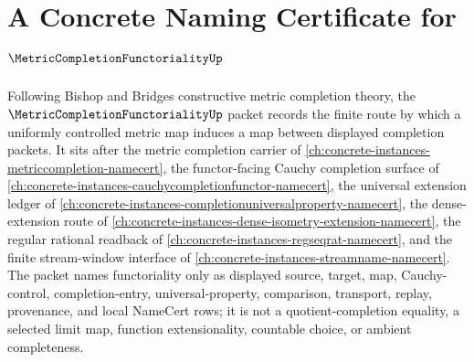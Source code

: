 \chapter{A Concrete Naming Certificate for $\MetricCompletionFunctorialityUp$}
\label{ch:concrete-instances-metric-completion-functoriality-namecert}

Following Bishop and Bridges constructive metric completion theory, the $\MetricCompletionFunctorialityUp$ packet records the finite route by which a uniformly controlled metric map induces a map between displayed completion packets. It sits after the metric completion carrier of \autoref{ch:concrete-instances-metriccompletion-namecert}, the functor-facing Cauchy completion surface of \autoref{ch:concrete-instances-cauchycompletionfunctor-namecert}, the universal extension ledger of \autoref{ch:concrete-instances-completionuniversalproperty-namecert}, the dense-extension route of \autoref{ch:concrete-instances-dense-isometry-extension-namecert}, the regular rational readback of \autoref{ch:concrete-instances-regseqrat-namecert}, and the finite stream-window interface of \autoref{ch:concrete-instances-streamname-namecert}. The packet names functoriality only as displayed source, target, map, Cauchy-control, completion-entry, universal-property, comparison, transport, replay, provenance, and local NameCert rows; it is not a quotient-completion equality, a selected limit map, function extensionality, countable choice, or ambient completeness.

